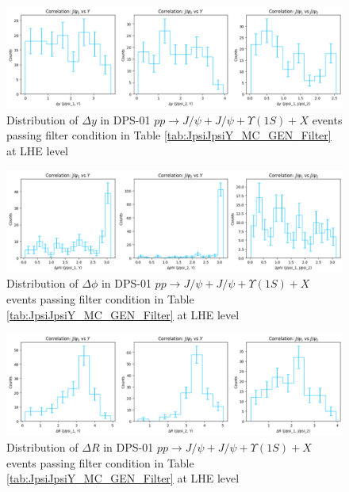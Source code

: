 \documentclass[10pt,twocolumn]{article}
\begin{document}
\begin{figure}
    \centering
    \includegraphics[width=1.0\linewidth]{images/LHE_LEVEL_DPS_J_JY1S_DeltaY_filtered.png}
    \caption{Distribution of $\Delta y$ in DPS-01 $pp\to J/\psi+J/\psi+\Upsilon(1S)+X$ events passing filter condition in Table \ref{tab:JpsiJpsiY_MC_GEN_Filter} at LHE level}
    \label{fig:DPS01_JJY1S_filtered_DeltaY_LHE}
\end{figure}

\begin{figure}
    \centering
    \includegraphics[width=1.0\linewidth]{images/LHE_LEVEL_DPS_J_JY1S_DeltaPhi_filtered.png}
    \caption{Distribution of $\Delta \phi$ in DPS-01 $pp\to J/\psi+J/\psi+\Upsilon(1S)+X$ events passing filter condition in Table \ref{tab:JpsiJpsiY_MC_GEN_Filter} at LHE level}
    \label{fig:DPS01_JJY1S_filtered_DeltaPhi_LHE}
\end{figure}

\begin{figure}
    \centering
    \includegraphics[width=1.0\linewidth]{images/LHE_LEVEL_DPS_J_JY1S_DeltaR_filtered.png}
    \caption{Distribution of $\Delta R$ in DPS-01 $pp\to J/\psi+J/\psi+\Upsilon(1S)+X$ events passing filter condition in Table \ref{tab:JpsiJpsiY_MC_GEN_Filter} at LHE level}
    \label{fig:DPS01_JJY1S_filtered_DeltaR_LHE}
\end{figure}
\end{document}
